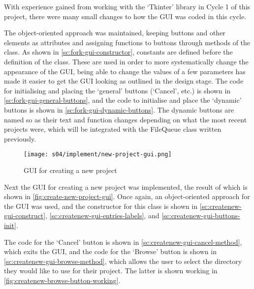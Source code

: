         With experience gained from working with the `Tkinter' library in Cycle 1 of this project, there were many small changes to how the GUI was coded in this cycle. 
        
        The object-oriented approach was maintained, keeping buttons and other elements as attributes and assigning functions to buttons through methods of the class. As shown in \autoref{sc:fork-gui-constructor}, constants are defined before the definition of the class. 
        These are used in order to more systematically change the appearance of the GUI, being able to change the values of a few parameters has made it easier to get the GUI looking as outlined in the design stage. 
        The code for initialising and placing the `general' buttons (`Cancel', etc.) is shown in \autoref{sc:fork-gui-general-buttons}, and the code to initialise and place the `dynamic' buttons is shown in \autoref{sc:fork-gui-dynamic-buttons}. 
        The dynamic buttons are named so as their text and function changes depending on what the most recent projects were, which will be integrated with the FileQueue class written previously. 

        
        \begin{figure}[!ht]
            \centering
            \texttt{[image: s04/implement/new-project-gui.png]}
            \caption{GUI for creating a new project}
            \label{fig:create-new-project-gui}
        \end{figure}

        Next the GUI for creating a new project was implemented, the result of which is shown in \autoref{fig:create-new-project-gui}.
        Once again, an object-oriented approach for the GUI was used, and the constructor for this class is shown in \autoref{sc:createnew-gui-construct}, \autoref{sc:createnew-gui-entries-labels}, and \autoref{sc:createnew-gui-buttons-init}.

        The code for the `Cancel' button is shown in \autoref{sc:createnew-gui-cancel-method}, which exits the GUI, and the code for the `Browse' button is shown in \autoref{sc:createnew-gui-browse-method}, which allows the user to select the directory they would like to use for their project.
        The latter is shown working in \autoref{fig:createnew-browse-button-working}.

